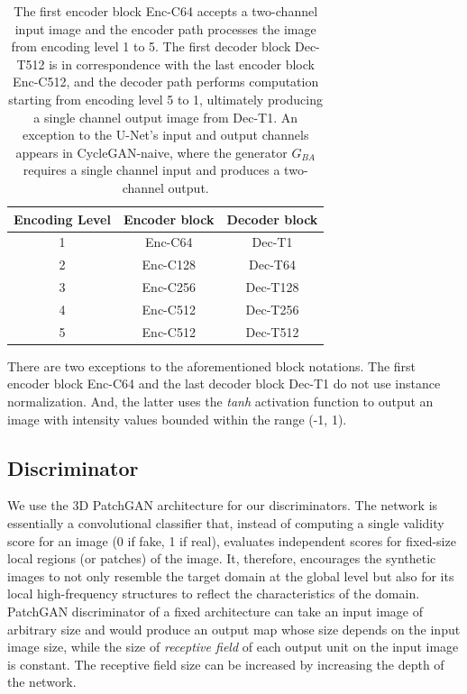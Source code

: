\begin{table}[h!]
    \centering
    \begin{tabular}{|c|c|c|}
        \hline
        \textbf{Encoding Level} & \textbf{Encoder block} & \textbf{Decoder block} \\
        \hline
        1     & Enc-C64          & Dec-T1           \\
        \hline
        2     & Enc-C128         & Dec-T64          \\
        \hline
        3     & Enc-C256         & Dec-T128         \\
        \hline
        4     & Enc-C512         & Dec-T256         \\
        \hline
        5     & Enc-C512         & Dec-T512         \\
        \hline
    \end{tabular}
    \caption{The first encoder block Enc-C64 accepts a two-channel input image and the encoder path processes the image from encoding level 1 to 5. The first decoder block Dec-T512 is in correspondence with the last encoder block Enc-C512, and the decoder path performs computation starting from encoding level 5 to 1, ultimately producing a single channel output image from Dec-T1. An exception to the U-Net's input and output channels appears in CycleGAN-naive, where the generator $G_{BA}$ requires a single channel input and produces a two-channel output.}
    \label{tab:generator_architecture}
\end{table}

There are two exceptions to the aforementioned block notations. The first encoder block Enc-C64 and the last decoder block Dec-T1 do not use instance normalization. And, the latter uses the \textit{tanh} activation function to output an image with intensity values bounded within the range (-1, 1). 


\subsection{Discriminator}
We use the 3D PatchGAN architecture for our discriminators. The network is essentially a convolutional classifier that, instead of computing a single validity score for an image (0 if fake, 1 if real), evaluates independent scores for fixed-size local regions (or patches) of the image. It, therefore, encourages the synthetic images to not only resemble the target domain at the global level but also for its local high-frequency structures to reflect the characteristics of the domain. PatchGAN discriminator of a fixed architecture can take an input image of arbitrary size and would produce an output map whose size depends on the input image size, while the size of \textit{receptive field} of each output unit on the input image is constant. The receptive field size can be increased by increasing the depth of the network.

